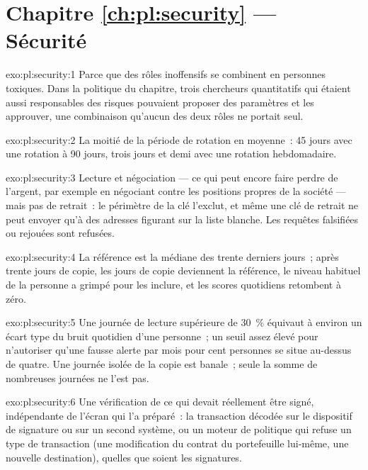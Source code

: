 \section*{Chapitre \ref{ch:pl:security} --- Sécurité}

\begin{solution}{exo:pl:security:1}
Parce que des rôles inoffensifs se combinent en personnes toxiques. Dans la politique du chapitre, trois chercheurs quantitatifs qui étaient aussi
responsables des risques pouvaient proposer des paramètres et les approuver, une combinaison qu'aucun des deux rôles ne portait seul.
\end{solution}

\begin{solution}{exo:pl:security:2}
La moitié de la période de rotation en moyenne~: 45 jours avec une rotation à 90 jours, trois jours et demi avec une rotation hebdomadaire.
\end{solution}

\begin{solution}{exo:pl:security:3}
Lecture et négociation --- ce qui peut encore faire perdre de l'argent, par exemple en négociant contre les positions propres de la société --- mais pas de retrait~: le périmètre de la clé
l'exclut, et même une clé de retrait ne peut envoyer qu'à des adresses figurant sur la liste blanche. Les requêtes falsifiées ou rejouées sont refusées.
\end{solution}

\begin{solution}{exo:pl:security:4}
La référence est la médiane des trente derniers jours~; après trente jours de copie, les jours de copie deviennent la référence, le niveau habituel
de la personne a grimpé pour les inclure, et les scores quotidiens retombent à zéro.
\end{solution}

\begin{solution}{exo:pl:security:5}
Une journée de lecture supérieure de 30~\% équivaut à environ un écart type du bruit quotidien d'une personne~; un seuil assez élevé pour n'autoriser qu'une fausse alerte par mois
pour cent personnes se situe au-dessus de quatre. Une journée isolée de la copie est banale~; seule la somme de nombreuses journées ne l'est pas.
\end{solution}

\begin{solution}{exo:pl:security:6}
Une vérification de ce qui devait réellement être signé, indépendante de l'écran qui l'a préparé~: la transaction décodée sur le dispositif de signature ou sur un second
système, ou un moteur de politique qui refuse un type de transaction (une modification du contrat du portefeuille lui-même, une nouvelle destination), quelles que soient les signatures.
\end{solution}

